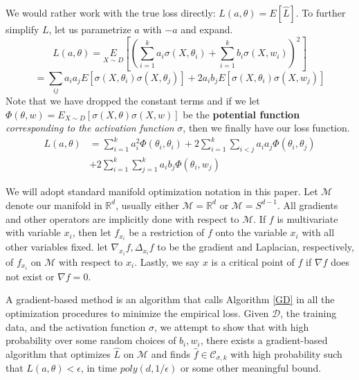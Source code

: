 \documentclass{article}
\newcommand{\R}{{\mathbb{R}}}
\begin{document}
We would rather work with the true loss directly: $L(a,\theta) = {E}[\widehat{L}]$. To further simplify $L$, let us parametrize $a$ with $-a$ and expand. 
\begin{equation*}
L(a,\theta)  = \underset{X\sim D}{E}\left[ \left(  \sum_{i=1}^k a_i \sigma(X,\theta_i) + \sum_{i=1}^k b_i\sigma(X,w_i)\right)^2\right]
\end{equation*}
\begin{equation*}
= \sum_{ij} a_i a_j E[\sigma(X,\theta_i)\sigma(X,\theta_j)]  + 2 a_ib_j E[\sigma(X,\theta_i)\sigma(X,w_j)] 
\end{equation*}
Note that we have dropped the constant terms and if we let $\Phi(\theta, w) = E_{X\sim D}[ \sigma(X,\theta) \sigma(X,w)]$ be the {\bf potential function} {\it corresponding to the activation function} $\sigma$, then we finally have our loss function.
\begin{equation}\label{errLoss}
\begin{split}
L(a,\theta) &= \sum_{i=1}^k a_i^2 \Phi(\theta_i,\theta_i) + 2\sum_{i=1}^k\sum_{i < j} a_i a_j \Phi(\theta_i,\theta_j) \\
&+ 2\sum_{i=1}^k\sum_{j=1}^k a_ib_j \Phi(\theta_i,w_j)
\end{split}
\end{equation}

We will adopt standard manifold optimization notation in this paper. Let $\mathcal{M}$ denote our manifold in $\R^d$, usually either $\mathcal{M}= \R^d$ or $\mathcal{M} =  S^{d-1}$. All gradients and other operators are implicitly done with respect to $\mathcal{M}$.  If $f$ is multivariate with variable $x_i$, then let $f_{x_i}$ be a restriction of $f$ onto the variable $x_i$ with all other variables fixed. let $\nabla_{x_i}f, \Delta_{x_i}f$ to be the gradient and Laplacian, respectively, of $f_{x_i}$ on $\mathcal{M}$ with respect to $x_i$. Lastly, we say $x$ is a critical point of $f$ if $\nabla f$ does not exist or $\nabla f = 0$.

A gradient-based method is an algorithm that calls Algorithm \ref{GD} in all the optimization procedures to minimize the empirical loss. Given $\mathcal{D}$, the training data, and the activation function $\sigma$, we attempt to show that with high probability over some random choices of $b_i, w_i$, there exists a gradient-based algorithm that optimizes $\widehat{L}$ on $\mathcal{M}$ and finds $\widehat{f} \in \mathcal{C}_{\sigma, k}$ with high probability such that $L(a,\theta) <\epsilon$, in time $poly(d,1/\epsilon)$ or some other meaningful bound.
\end{document}
